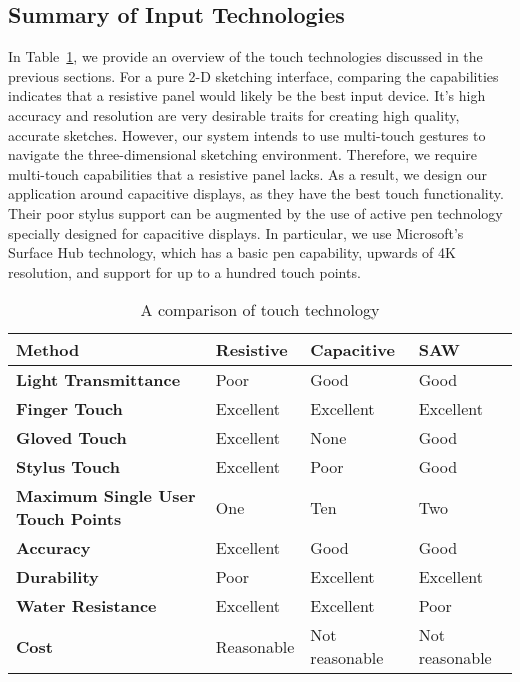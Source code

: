 \subsection{Summary of Input Technologies}

In Table~\ref{tab:touchtech}, we provide an overview of the touch technologies discussed in the previous sections.
For a pure 2-D sketching interface, comparing the capabilities indicates that a resistive panel would likely be the best input device.
It's high accuracy and resolution are very desirable traits for creating high quality, accurate sketches.
However, our system intends to use multi-touch gestures to navigate the three-dimensional sketching environment.
Therefore, we require multi-touch capabilities that a resistive panel lacks.
As a result, we design our application around capacitive displays, as they have the best touch functionality.
Their poor stylus support can be augmented by the use of active pen technology specially designed for capacitive displays.
In particular, we use Microsoft's Surface Hub technology, which has a basic pen capability, upwards of 4K resolution, and support for up to a hundred touch points.

\begin{table}
\label{tab:touchtech}
\begin{center}
\begin{tabular}{| p{5cm} | l | p{3cm} | l |}
\hline
\textbf{Method} & \textbf{Resistive} & \textbf{Capacitive} & \textbf{SAW} \\ \hline
\textbf{Light Transmittance} & Poor & Good & Good \\ \hline
\textbf{Finger Touch} & Excellent & Excellent & Excellent \\ \hline
\textbf{Gloved Touch} & Excellent & None & Good \\ \hline
\textbf{Stylus Touch} & Excellent & Poor & Good \\ \hline
\textbf{Maximum Single User Touch Points} & One & Ten & Two \\ \hline
\textbf{Accuracy} & Excellent & Good & Good \\ \hline
\textbf{Durability} & Poor & Excellent & Excellent \\ \hline
\textbf{Water Resistance} & Excellent & Excellent & Poor \\ \hline
\textbf{Cost} & Reasonable & Not reasonable & Not reasonable \\ \hline
\end{tabular}
\end{center}
\caption{A comparison of touch technology}
\end{table}

